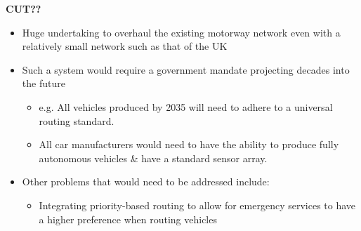 \documentclass{beamer}
\begin{document}
\begin{frame}
    

   \textbf{CUT??} 
    \begin{itemize}
        \item Huge undertaking to overhaul the existing motorway network even with a relatively small network such as that of the UK
        \item Such a system would require a government mandate projecting decades into the future
            \begin{itemize}
                \item e.g. All vehicles produced by 2035 will need to adhere to a universal routing standard.
                \item All car manufacturers would need to have the ability to produce fully autonomous vehicles \& have a standard sensor array.
            \end{itemize}
        \item Other problems that would need to be addressed include:
            \begin{itemize}
                \item Integrating priority-based routing to allow for emergency services to have a higher preference when routing vehicles
            \end{itemize}
    \end{itemize}
\end{frame}
\end{document}
